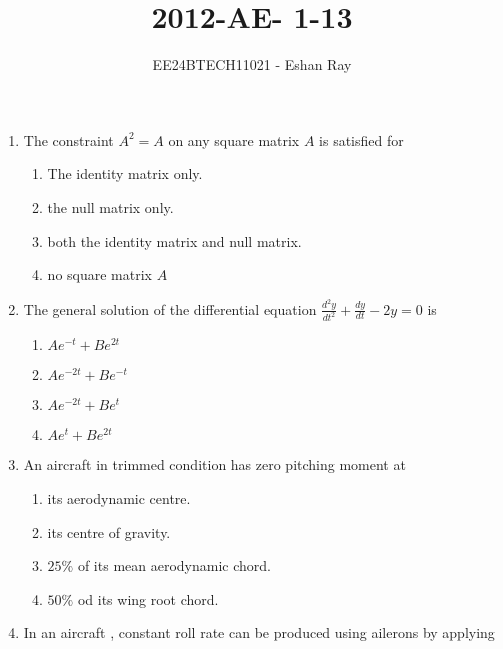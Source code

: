 \documentclass[journal]{IEEEtran}
\begin{document}

\vspace{3cm}

\title{2012-AE- 1-13}
\author{EE24BTECH11021 - Eshan Ray}

{\let\newpage\relax\maketitle}

\renewcommand{\thefigure}{\theenumi}
\renewcommand{\thetable}{\theenumi}
\setlength{\intextsep}{10pt} %

\begin{enumerate}
    \item The constraint $A^2=A$ on any square matrix $A$ is satisfied for
    \begin{enumerate}
        \item The identity matrix only.
        \item the null matrix only.
        \item both the identity matrix and null matrix.
        \item no square matrix $A$
    \end{enumerate}
    \item The general solution of the differential equation $\frac{d^2y}{dt^2}+\frac{dy}{dt}-2y=0$ is  
    \begin{enumerate}
        \item $Ae^{-t}+Be^{2t}$
        \item $Ae^{-2t}+Be^{-t}$
        \item $Ae^{-2t}+Be^{t}$
        \item $Ae^{t}+Be^{2t}$
    \end{enumerate}
    \item An aircraft in trimmed condition has zero pitching moment at 
    \begin{enumerate}
        \item its aerodynamic centre.
        \item its centre of gravity.
        \item $25\%$ of its mean aerodynamic chord.
        \item $50\%$ od its wing root chord.
    \end{enumerate}
    \item In an aircraft , constant roll rate can be produced using ailerons by applying

\end{enumerate}
\end{document}
